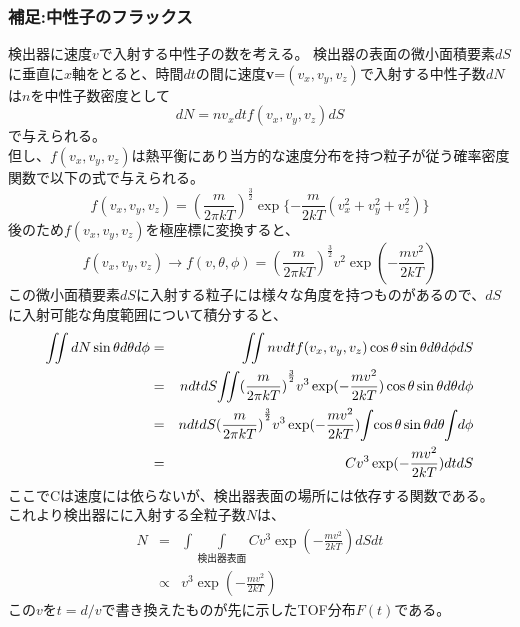 \subsubsection{補足:中性子のフラックス}
検出器に速度$v$で入射する中性子の数を考える。
検出器の表面の微小面積要素$dS$に垂直に$x$軸をとると、時間$dt$の間に速度{\bf v}=$(v_x,v_y,v_z)$で入射する中性子数$dN$は$n$を中性子数密度として
\begin{equation}
dN=nv_xdtf(v_x,v_y,v_z)dS
\end{equation}
で与えられる。\\
但し、$f(v_x,v_y,v_z)$は熱平衡にあり当方的な速度分布を持つ粒子が従う確率密度関数で以下の式で与えられる。
\begin{equation}
f(v_x,v_y,v_z)={(\frac{m}{2\pi kT})}^{\frac{3}{2}}\exp\{-\frac{m}{2kT}(v^2_x+v^2_y+v^2_z)\} 
\end{equation}
後のため$f(v_x,v_y,v_z)$を極座標に変換すると、
\begin{equation}
f(v_x,v_y,v_z) \rightarrow f(v,\theta,\phi)={(\frac{m}{2\pi kT})}^{\frac{3}{2}}v^2\exp(-\frac{mv^2}{2kT})
\end{equation}
この微小面積要素$dS$に入射する粒子には様々な角度を持つものがあるので、$dS$に入射可能な角度範囲について積分すると、
\begin{eqnarray*}
 \iint dN\sin\theta d\theta d\phi &=&\iint nvdtf(v_x,v_y,v_z)\cos\theta \sin\theta d\theta d\phi dS \\ 
&=&ndtdS \hspace{-2pt}\iint \hspace{-2pt}{(\frac{m}{2\pi kT})}^{\frac{3}{2}}v^3\exp(-\frac{mv^2}{2kT})\cos\theta \sin\theta d\theta d\phi  \\
&=&ndtdS{(\frac{m}{2\pi kT})}^{\frac{3}{2}} v^3\exp(-\frac{mv^2}{2kT}) \hspace{-2pt}\int \hspace{-2pt}\cos\theta\sin\theta d\theta \hspace{-2pt}\int \hspace{-2pt} d\phi \\
&=&Cv^3\exp(-\frac{mv^2}{2kT})dtdS
\end{eqnarray*}
ここでCは速度には依らないが、検出器表面の場所には依存する関数である。\\
これより検出器にに入射する全粒子数$N$は、
\begin{eqnarray*}
N &=&
\int\int\limits_{\text{} 検出器表面}Cv^3\exp(-\frac{mv^2}{2kT})dSdt \\
&\propto& v^3\exp(-\frac{mv^2}{2kT})
\end{eqnarray*}
この$v$を$t=d/v$で書き換えたものが先に示したTOF分布$F(t)$である。
\newpage
